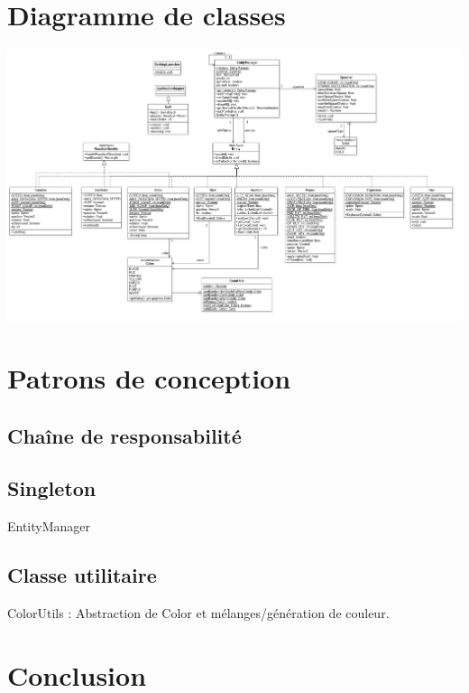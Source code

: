 \documentclass[11pt,a4paper,twoside,svgnames]{article}
\begin{document}
\section{Diagramme de classes}
\includegraphics[scale=0.35,angle=90,origin=c]{uml_cor.jpg}
\clearpage
\section{Patrons de conception}
\subsection{Chaîne de responsabilité}

\subsection{Singleton}
EntityManager
\subsection{Classe utilitaire}
ColorUtils : Abstraction de Color et mélanges/génération de couleur.

\section{Conclusion}
\end{document}
